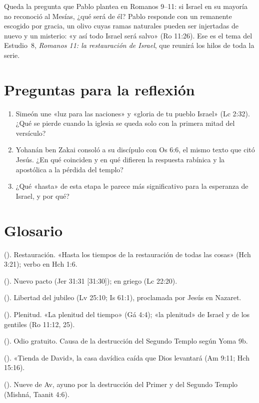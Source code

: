 Queda la pregunta que Pablo plantea en Romanos 9--11: si Israel en su mayoría no reconoció al Mesías, ¿qué será de él? Pablo responde con un remanente escogido por gracia, un olivo cuyas ramas naturales pueden ser injertadas de nuevo y un misterio: «y así todo Israel será salvo» (Ro 11:26). Ese es el tema del Estudio~8, \emph{Romanos 11: la restauración de Israel}, que reunirá los hilos de toda la serie.

\section*{Preguntas para la reflexión}
\begin{enumerate}
\item Simeón une «luz para las naciones» y «gloria de tu pueblo Israel» (Lc 2:32). ¿Qué se pierde cuando la iglesia se queda solo con la primera mitad del versículo?
\item Yohanán ben Zakai consoló a su discípulo con Os 6:6, el mismo texto que citó Jesús. ¿En qué coinciden y en qué difieren la respuesta rabínica y la apostólica a la pérdida del templo?
\item ¿Qué «hasta» de esta etapa le parece más significativo para la esperanza de Israel, y por qué?
\end{enumerate}

\section*{Glosario}
\begin{description}\small
\item[Apokatástasis] (). Restauración. «Hasta los tiempos de la restauración de todas las cosas» (Hch 3:21); verbo en Hch 1:6.
\item[Brit jadashá] (). Nuevo pacto (Jer 31:31 [31:30]); en griego  (Lc 22:20).
\item[Derór] (). Libertad del jubileo (Lv 25:10; Is 61:1), proclamada por Jesús en Nazaret.
\item[Pléroma] (). Plenitud. «La plenitud del tiempo» (Gá 4:4); «la plenitud» de Israel y de los gentiles (Ro 11:12, 25).
\item[Sinat jinam] (). Odio gratuito. Causa de la destrucción del Segundo Templo según Yoma 9b.
\item[Sukkat David] (). «Tienda de David», la casa davídica caída que Dios levantará (Am 9:11; Hch 15:16).
\item[Tisha be-Av] (). Nueve de Av, ayuno por la destrucción del Primer y del Segundo Templo (Mishná, Taanit 4:6).
\end{description}

